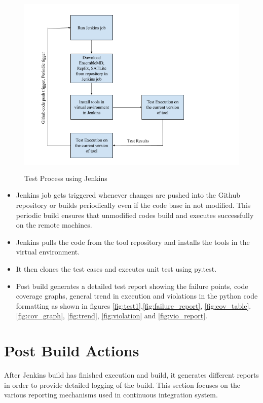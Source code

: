 \documentclass[10pt]{ruthesis}
\begin{document}
\begin{figure}
  \begin{center}
  \includegraphics[width=13cm,height=9cm]{jenkins_process.png}
  \caption{Test Process using Jenkins}
  \label{fig:jenkins_process}
  \end{center}
\end{figure}

\begin{itemize}
\item Jenkins job gets triggered whenever changes are pushed into the Github repository or builds periodically even if the code base in not modified. This periodic build ensures that unmodified codes build and executes successfully on the remote machines.

\item Jenkins pulls the code from the tool repository and installs the tools in the virtual environment.

\item It then clones the test cases and executes unit test using py.test.

\item Post build generates a detailed test report showing the failure points, code coverage graphs, general trend in execution and violations in the python code formatting as shown in figures \ref{fig:test1},\ref{fig:failure_report}, \ref{fig:cov_table}. \ref{fig:cov_graph}, \ref{fig:trend}, \ref{fig:violation} and \ref{fig:vio_report}. 
\end{itemize}

\section{Post Build Actions}
After Jenkins build has finished execution and build, it generates different reports in order to provide detailed logging of the build. This section focuses on the various reporting mechanisms used in continuous integration system.
\end{document}
